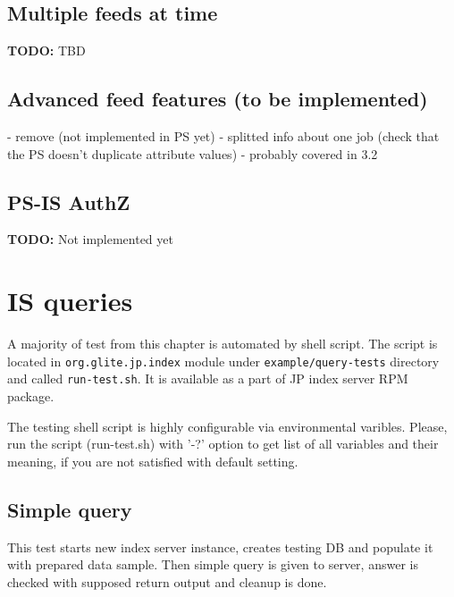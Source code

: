 \documentclass{egee}
\def\todo#1{\textbf{TODO:} #1}
\begin{document}
\subsection{Multiple feeds at time}
\todo{TBD}

\subsection{Advanced feed features (to be implemented)}
- remove (not implemented in PS yet)
- splitted info about one job (check that the PS doesn't duplicate
  attribute values) - probably covered in 3.2


\subsection{PS-IS AuthZ}
\todo{Not implemented yet}

\section{IS queries}


%
%
%

A majority of test from this chapter is automated by shell
script. The script is located in \texttt{org.glite.jp.index} module
under \texttt{example/query-tests} directory and called \texttt{run-test.sh}.
It is available as a part of JP index server RPM package.

\begin{hints}
The testing shell script is highly configurable via
environmental varibles.  Please, run the script (run-test.sh) with
'-?' option to get list of all variables and their meaning, if you are
not satisfied with default setting.
\end{hints}

\subsection{Simple query}
This test starts new index server instance, creates testing DB
and populate it with prepared data sample. Then simple query is given
to server, answer is checked with supposed return output and
cleanup is done.
\end{document}
